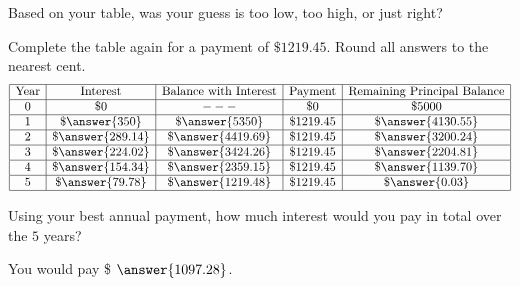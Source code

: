 \documentclass{ximera}
\begin{document}
\begin{question}
Based on your table, was your guess is too low, too high, or just
right?
\begin{multipleChoice}
\end{multipleChoice}

\end{question}

\begin{question}%

  Complete the table again for a payment
  of $\$1219.45$.  Round all answers to the nearest cent.
  \[
  \begin{array}{|c|c|c|c|c|}
    \hline
    \text{Year} & \text{Interest}             & \text{Balance with Interest} & \text{Payment}    & \text{Remaining Principal Balance}\\ \hline
    0  & \$ 0               & ---                   & \$ 0        & \$ 5000 \\ \hline
    1  & \$ \answer{350}    & \$ \answer{5350}    & \$ 1219.45  & \$ \answer{4130.55} \\ \hline
    2  & \$ \answer{289.14} & \$ \answer{4419.69} & \$ 1219.45  & \$ \answer{3200.24} \\ \hline
    3  & \$ \answer{224.02} & \$ \answer{3424.26} & \$ 1219.45  & \$ \answer{2204.81} \\ \hline
    4  & \$ \answer{154.34} & \$ \answer{2359.15} & \$ 1219.45  & \$ \answer{1139.70} \\ \hline
    5  & \$ \answer{79.78}  & \$ \answer{1219.48} & \$ 1219.45  & \$ \answer{0.03} \\ \hline
    \end{array}
  \]

\end{question}

\begin{question}
Using your best annual payment, how much interest would you pay in total over the $5$ years? 
\begin{prompt}
  You would pay \$ $\answer{1097.28}$.
\end{prompt}
\end{question}

\end{document}
